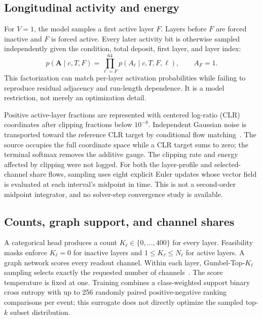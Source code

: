 \documentclass[11pt]{article}
\begin{document}
\subsection{Longitudinal activity and energy}

For $V=1$, the model samples a first active layer $F$. Layers before $F$ are forced inactive and $F$ is forced active. Every later activity bit is otherwise sampled independently given the condition, total deposit, first layer, and layer index:
\begin{equation}
 p(\mathbf A\mid c,T,F)=\prod_{\ell=F}^{64}p(A_\ell\mid c,T,F,\ell),\qquad A_F=1.
\end{equation}
This factorization can match per-layer activation probabilities while failing to reproduce residual adjacency and run-length dependence. It is a model restriction, not merely an optimization detail.

Positive active-layer fractions are represented with centered log-ratio (CLR) coordinates after clipping fractions below $10^{-8}$. Independent Gaussian noise is transported toward the reference CLR target by conditional flow matching~\cite{flowmatching}. The source occupies the full coordinate space while a CLR target sums to zero; the terminal softmax removes the additive gauge. The clipping rate and energy affected by clipping were not logged. For both the layer-profile and selected-channel share flows, sampling uses eight explicit Euler updates whose vector field is evaluated at each interval's midpoint in time. This is not a second-order midpoint integrator, and no solver-step convergence study is available.

\subsection{Counts, graph support, and channel shares}

A categorical head produces a count $K_\ell\in\{0,\ldots,400\}$ for every layer. Feasibility masks enforce $K_\ell=0$ for inactive layers and $1\leq K_\ell\leq N_\ell$ for active layers. A graph network scores every readout channel. Within each layer, Gumbel-Top-$K_\ell$ sampling selects exactly the requested number of channels~\cite{gumbeltopk}. The score temperature is fixed at one. Training combines a class-weighted support binary cross entropy with up to 256 randomly paired positive-negative ranking comparisons per event; this surrogate does not directly optimize the sampled top-$k$ subset distribution.
\end{document}
